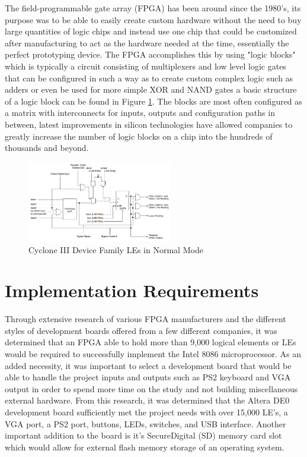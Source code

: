\documentclass[conference]{IEEEtran}
\begin{document}
The field-programmable gate array (FPGA) has been around since the 1980's, its purpose was to be able to easily create custom hardware without the need to buy large quantities of logic chips and instead use one chip that could be customized after manufacturing to act as the hardware needed at the time, essentially the perfect prototyping device. The FPGA accomplishes this by using "logic blocks" which is typically a circuit consisting of multiplexers and low level logic gates that can be configured in such a way as to create custom complex logic such as adders or even be used for more simple XOR and NAND gates a basic structure of a logic block can be found in Figure \ref{fig:LogicElement}. The blocks are most often configured as a matrix with interconnects for inputs, outputs and configuration paths in between, latest improvements in silicon technologies have allowed companies to greatly increase the number of logic blocks on a chip into the hundreds of thousands and beyond.

\begin{figure}[!t]
\centering
\includegraphics[width=2.5in]{LogicElement}
\caption{Cyclone III Device Family LEs in Normal Mode \cite{CycloneHandbook}}
\label{fig:LogicElement}
\end{figure}

\section{Implementation Requirements}
Through extensive research of various FPGA manufacturers and the different styles of development boards offered from a few different companies, it was determined that an FPGA able to hold more than 9,000 logical elements or LEs would be required to successfully implement the Intel 8086 microprocessor. As an added necessity, it was important to select a development board that would be able to handle the project inputs and outputs such as PS2 keyboard and VGA output in order to spend more time on the study and not building miscellaneous external hardware.  From this research, it was determined that the Altera DE0 development board sufficiently met the project needs with over 15,000 LE's, a VGA port, a PS2 port, buttons, LEDs, switches, and USB interface. Another important addition to the board is it's SecureDigital (SD) memory card slot which would allow for external flash  memory storage of an operating system.
\end{document}
